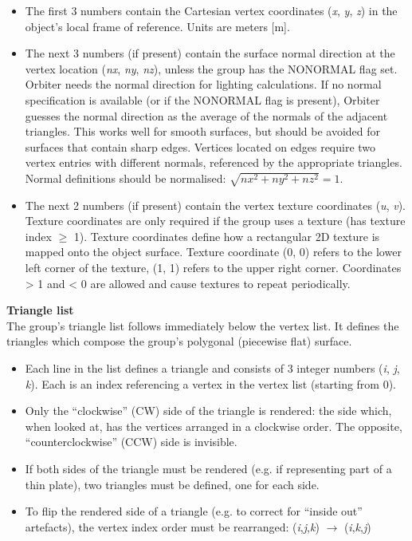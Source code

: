 \documentclass[Orbiter Developer Manual.tex]{subfiles}
\begin{document}
\begin{itemize}
\item The first 3 numbers contain the Cartesian vertex coordinates (\textit{x}, \textit{y}, \textit{z}) in the object’s local frame of reference. Units are meters [m].
\item The next 3 numbers (if present) contain the surface normal direction at the vertex location (\textit{nx}, \textit{ny}, \textit{nz}), unless the group has the NONORMAL flag set. Orbiter needs the normal direction for lighting calculations. If no normal specification is available (or if the NONORMAL flag is present), Orbiter guesses the normal direction as the average of the normals of the adjacent triangles. This works well for smooth surfaces, but should be avoided for surfaces that contain sharp edges. Vertices located on edges require two vertex entries with different normals, referenced by the appropriate triangles. Normal definitions should be normalised: $\sqrt{nx^{2}+ny^{2}+nz^{2}} = 1$.
\item The next 2 numbers (if present) contain the vertex texture coordinates (\textit{u}, \textit{v}). Texture coordinates are only required if the group uses a texture (has texture index $\geq$ 1). Texture coordinates define how a rectangular 2D texture is mapped onto the object surface. Texture coordinate (0, 0) refers to the lower left corner of the texture, (1, 1) refers to the upper right corner. Coordinates > 1 and < 0 are allowed and cause textures to repeat periodically.
\end{itemize}


\noindent
\textbf{Triangle list}\\
The group’s triangle list follows immediately below the vertex list. It defines the triangles which compose the group’s polygonal (piecewise flat) surface.

\begin{itemize}
\item Each line in the list defines a triangle and consists of 3 integer numbers (\textit{i}, \textit{j}, \textit{k}). Each is an index referencing a vertex in the vertex list (starting from 0).
\item Only the “clockwise” (CW) side of the triangle is rendered: the side which, when looked at, has the vertices arranged in a clockwise order. The opposite, “counterclockwise” (CCW) side is invisible.
\item If both sides of the triangle must be rendered (e.g. if representing part of a thin plate), two triangles must be defined, one for each side.
\item To flip the rendered side of a triangle (e.g. to correct for “inside out” artefacts), the vertex index order must be rearranged: (\textit{i},\textit{j},\textit{k}) $\rightarrow$ (\textit{i},\textit{k},\textit{j})
\end{itemize}
\end{document}
